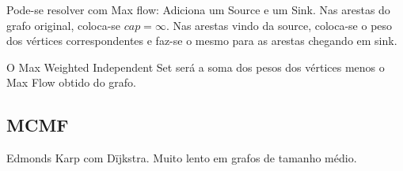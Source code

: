 Pode-se resolver com Max flow: Adiciona um Source e um Sink. Nas arestas do grafo original, coloca-se $cap=\infty$. Nas arestas vindo da source, coloca-se o peso dos v\'{e}rtices correspondentes e faz-se o mesmo para as arestas chegando em sink.

O Max Weighted Independent Set ser\'{a} a soma dos pesos dos v\'{e}rtices menos o Max Flow obtido do grafo.
\divisor

\subsection{MCMF}
Edmonds Karp com D\"{i}jkstra. Muito lento em grafos de tamanho m\'{e}dio.
\divisor
